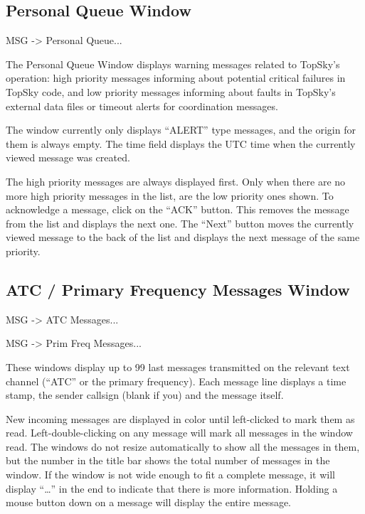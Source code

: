 \documentclass[a4paper,oneside,11pt]{memoir}
\begin{document}
\subsection{Personal Queue Window}
\label{win:pqw}

 MSG -> Personal Queue...

\bigskip


The Personal Queue Window displays warning messages related to TopSky’s operation: high priority messages informing about potential critical failures in TopSky code, and low priority messages informing about faults in TopSky’s external data files or timeout alerts for coordination messages.

\bigskip

The window currently only displays “ALERT” type messages, and the origin for them is always empty. The time field displays the UTC time when the currently viewed message was created.

\bigskip

The high priority messages are always displayed first. Only when there are no more high priority messages in the list, are the low priority ones shown. To acknowledge a message, click on the “ACK” button. This removes the message from the list and displays the next one. The “Next” button moves the currently viewed message to the back of the list and displays the next message of the same priority.

\subsection{ATC / Primary Frequency Messages Window}
\label{win:atcmw}
\label{win:pfmw}

 MSG -> ATC Messages...

 MSG -> Prim Freq Messages...

\bigskip


These windows display up to 99 last messages transmitted on the relevant text channel (“ATC” or the primary frequency). Each message line displays a time stamp, the sender callsign (blank if you) and the message itself.

\bigskip

New incoming messages are displayed in  color until left-clicked to mark them as read. Left-double-clicking on any message will mark all messages in the window read. The windows do not resize automatically to show all the messages in them, but the number in the title bar shows the total number of messages in the window. If the window is not wide enough to fit a complete message, it will display “…” in the end to indicate that there is more information. Holding a mouse button down on a message will display the entire message.
\end{document}
